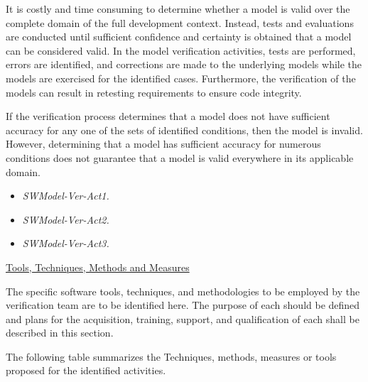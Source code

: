It is costly and time consuming to determine whether a model is valid
over the complete domain of the full development context. Instead,
tests and evaluations are conducted until sufficient confidence and
certainty is obtained that a model can be considered valid. In the
model verification activities, tests are performed, errors are
identified, and corrections are made to the underlying models while
the models are exercised for the identified cases. Furthermore, the
verification of the models can result in retesting requirements to
ensure code integrity.

If the verification process determines that a model does not have
sufficient accuracy for any one of the sets of identified conditions,
then the model is invalid. However, determining that a model has
sufficient accuracy for numerous conditions does not guarantee that a
model is valid everywhere in its applicable domain.

\begin{itemize}
\item {\it SWModel-Ver-Act1.} 
\item {\it SWModel-Ver-Act2. }  
\item {\it SWModel-Ver-Act3. }
\end{itemize}

\underline{Tools, Techniques, Methods and Measures} 

The specific software tools, techniques, and methodologies to be
employed by the verification team are to be identified here. 
The purpose of each should be defined and plans for the acquisition,
training, support, and qualification of each shall be described in
this section. 

The following table summarizes the Techniques, methods, measures or
tools proposed for the identified activities.

